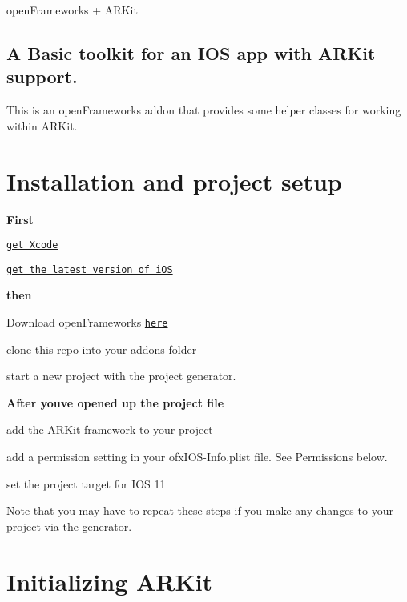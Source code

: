 open\+Frameworks + A\+R\+Kit

\subsection*{A Basic toolkit for an I\+OS app with A\+R\+Kit support.}

This is an open\+Frameworks addon that provides some helper classes for working within A\+R\+Kit.

\section*{Installation and project setup}

{\bfseries First}
\begin{DoxyItemize}
\item \href{https://developer.apple.com/xcode/}{\tt get Xcode}
\item \href{https://www.apple.com/ios}{\tt get the latest version of i\+OS}
\end{DoxyItemize}

{\bfseries then}
\begin{DoxyItemize}
\item Download open\+Frameworks \href{https://openframeworks.cc/versions/v0.10.0/of_v0.10.0_ios_release.zip}{\tt here}
\item clone this repo into your addons folder
\item start a new project with the project generator.
\end{DoxyItemize}

{\bfseries After you\textquotesingle{}ve opened up the project file}
\begin{DoxyItemize}
\item add the A\+R\+Kit framework to your project
\end{DoxyItemize}




\begin{DoxyItemize}
\item add a permission setting in your {\ttfamily ofx\+I\+O\+S-\/\+Info.\+plist} file. See Permissions below.
\item set the project target for I\+OS 11 
\end{DoxyItemize}

Note that you may have to repeat these steps if you make any changes to your project via the generator.

\section*{Initializing A\+R\+Kit}

